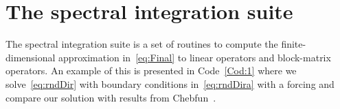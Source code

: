 \documentclass[%
secnumarabic,%
 amssymb, amsmath,%
 aps,prf,superscriptaddress,longbibliography
frontmatterverbose,
]{revtex4-2}
\begin{document}
%
%
\section{The spectral integration suite}
The spectral integration suite is a set of routines to compute the finite-dimensional approximation in~\eqref{eq:Final} to linear operators and block-matrix operators. 
An example of this is presented in Code~\ref{Cod:1} where we solve~\eqref{eq:rndDir} with boundary conditions in~\eqref{eq:rndDira} with a forcing and compare our solution with results from Chebfun~\cite{driscoll2014chebfun}.
\end{document}
